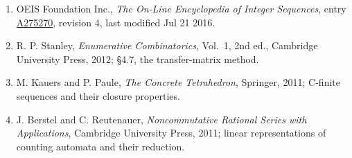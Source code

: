 \documentclass[11pt]{article}
\theoremstyle{definition}
\begin{document}
\begin{enumerate}

\item OEIS Foundation Inc., \emph{The On-Line Encyclopedia of Integer Sequences}, entry \href{https://oeis.org/A275270}{A275270}, revision 4, last modified Jul 21 2016.

\item R. P. Stanley, \emph{Enumerative Combinatorics}, Vol.~1, 2nd ed., Cambridge University Press, 2012; \S4.7, the transfer-matrix method.

\item M. Kauers and P. Paule, \emph{The Concrete Tetrahedron}, Springer, 2011; C-finite sequences and their closure properties.

\item J. Berstel and C. Reutenauer, \emph{Noncommutative Rational Series with Applications}, Cambridge University Press, 2011; linear representations of counting automata and their reduction.

\end{enumerate}
\end{document}
